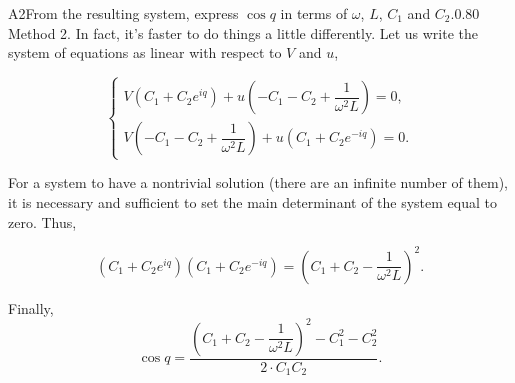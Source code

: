 \documentclass[11pt,a4paper]{article}
\begin{document}
\begin{solcard}{A2}{From the resulting system, express $\cos q $ in terms of $\omega$, $L$, $C_1$ and $C_2$.}{0.80}
Method 2. In fact, it's faster to do things a little differently. Let us write the system of equations as linear with respect to $V$ and $u$,


$$\begin{cases} V\left(C_1+C_2 e^{iq}\right)+u\left(-C_1-C_2+\dfrac{1}{\omega^2 L}\right)=0,\\ V\left(-C_1-C_2+\dfrac{1}{\omega^2 L}\right)+u\left(C_1+C_2 e^{-iq}\right)=0. \end{cases}$$


For a system to have a nontrivial solution (there are an infinite number of them), it is necessary and sufficient to set the main determinant of the system equal to zero. Thus,


$$\left(C_1+C_2 e^{iq}\right)\left(C_1+C_2 e^{-iq}\right)=\left(C_1+C_2-\dfrac{1}{\omega^2 L}\right)^2.$$


Finally, $$\cos q = \dfrac{\left( C_1 + C_2 - \dfrac{1}{\omega^2 L} \right)^2-C_1^2-C_2^2}{2 \cdot C_1C_2}.$$

\end{solcard}
\end{document}
